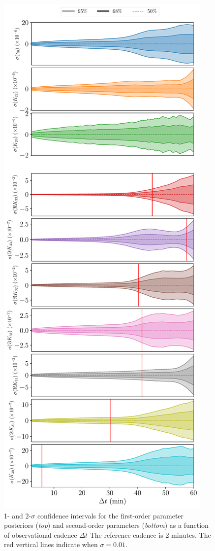 \documentclass[fleqn,usenatbib]{mnras}
\begin{document}
\begin{figure}
  \centering
  \includegraphics[height=0.89\textheight]{figs/scan-cadence.pdf}
  \caption{1- and 2-$\sigma$ confidence intervals for the first-order parameter posteriors (\textit{top}) and second-order parameters (\textit{bottom}) as a function of observational cadence $\Delta t$ The reference cadence is 2 minutes. The red vertical lines indicate when $\sigma = 0.01$.}
  \label{fig:scan-cadence}
\end{figure}
\end{document}
